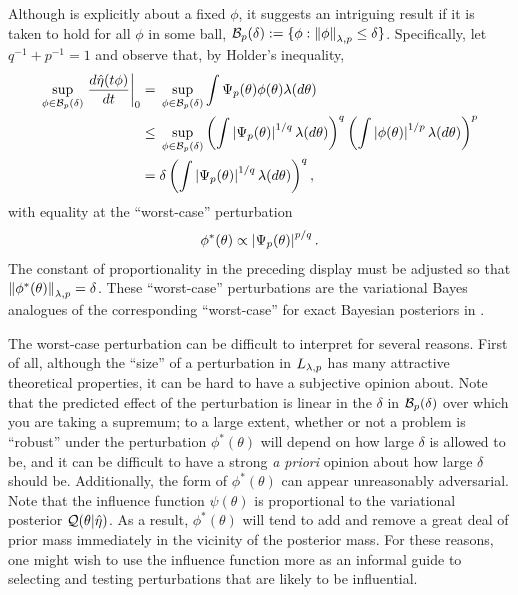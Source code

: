 Although  is explicitly about a fixed $\phi$,
it suggests an intriguing result if it is taken to hold for all $\phi$ in some
ball, $\mathcal{B}_p(\delta) := \{\phi: \left\Vert\phi\right\Vert_{\lambda,p} \le \delta \}$.
Specifically, let $q^{-1} + p^{-1} = 1$ and observe that, by Holder's inequality,
%
\begin{align*}
%
\sup_{\phi \in \ball_p(\delta)} \fracat{d \etaopt(\t \phi)}{d \t}{0} ={}&
    \sup_{\phi \in \ball_p(\delta)}
        \int \infl_p(\theta) \phi(\theta) \lambda(d\theta)
\\\le{}&
    \sup_{\phi \in \ball_p(\delta)}
        \left( \int \abs{\infl_p(\theta)}^{1/q} \lambda(d\theta) \right)^q
        \left( \int \abs{\phi(\theta)}^{1/p} \lambda(d\theta)\right)^p
\\={}&
\delta \left( \int \abs{\infl_p(\theta)}^{1/q} \lambda(d\theta) \right)^q,
%
\end{align*}
%
with equality at the ``worst-case'' perturbation
%
\begin{align*}
%
\phi^*(\theta) \propto \abs{\infl_p(\theta)}^{p/q}.
%
\end{align*}
%
The constant of proportionality in the preceding display must be adjusted so
that $\left\Vert\phi^*(\theta)\right\Vert_{\lambda,p} = \delta$.  These ``worst-case''
perturbations are the variational Bayes analogues of the corresponding
``worst-case'' for exact Bayesian posteriors in \citet{gustafson:1996:local}.

The worst-case perturbation can be difficult to interpret for several reasons.
First of all, although the ``size'' of a perturbation in ${L_{\lambda,p}}$ has
many attractive theoretical properties, it can be hard to have a subjective
opinion about.  Note that the predicted effect of the perturbation is linear in
the $\delta$ in $\mathcal{B}_p(\delta)$ over which you are taking a supremum; to a
large extent, whether or not a problem is ``robust'' under the perturbation
$\phi^*(\theta)$ will depend on how large $\delta$ is allowed to be, and it can
be difficult to have a strong {\em a priori} opinion about how large $\delta$
should be.  Additionally, the form of $\phi^*(\theta)$ can appear unreasonably
adversarial. Note that the influence function $\psi(\theta)$ is proportional to
the variational posterior $\mathcal{Q}(\theta \vert \hat\eta)$.  As a result,
$\phi^*(\theta)$ will tend to add and remove a great deal of prior mass
immediately in the vicinity of the posterior mass.  For these reasons,
one might wish to use the influence function more as an informal guide to
selecting and testing perturbations that are likely to be influential.

